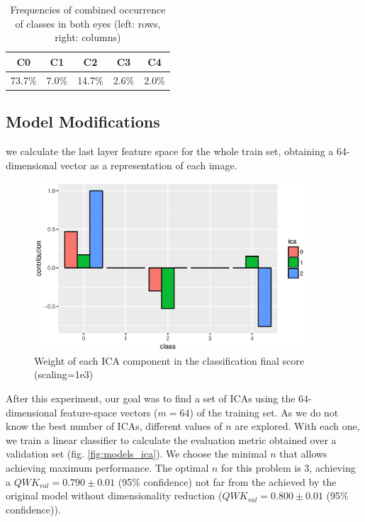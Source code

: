 \documentclass[review]{elsarticle}
\theoremstyle{definition} %
\theoremstyle{remark}
\begin{document}
\begin{table}[ht!]
	\centering
	\begin{tabular}{c c c c c } 
		\hline
		 C0 & C1 & C2 & C3 & C4 \\ [0.5ex] 
		\hline\hline
		 73.7\% & 7.0\% & 14.7\% & 2.6\% & 2.0\%\\
		\hline
	\end{tabular}
	\caption[Frequencies of combined occurrence of classes in both eyes]{Frequencies of combined occurrence of classes in both eyes (left: rows, right: columns)}
	\label{class:tab:classperc}
\end{table}

\subsection{Model Modifications}

 we calculate the last layer feature space for the whole train set, obtaining a 64-dimensional vector as a representation of each image.  

\begin{figure}[h]
	\centering	
	\includegraphics[width=0.90\textwidth]{./figures/ica_class_contribution.eps}
	\caption{Weight of each ICA component in the classification final score (scaling=1e3)}
	\label{fig:ica_contribution}
\end{figure}

After this experiment, our goal was to find a set of ICAs using the 64-dimensional feature-space vectors ($m=64$) of the training set. As we do not know the best number of ICAs, different values of $n$ are explored. With each one, we train a linear classifier to calculate the evaluation metric obtained over a validation set (fig. \ref{fig:models_ica}). We choose the minimal $n$ that allows achieving maximum performance. The optimal $n$ for this problem is $3$, achieving a $QWK_{val} = 0.790 \pm 0.01$ (95\% confidence) not far from the achieved by the original model without dimensionality reduction ($QWK_{val} = 0.800 \pm 0.01$ (95\% confidence)). 
\end{document}
